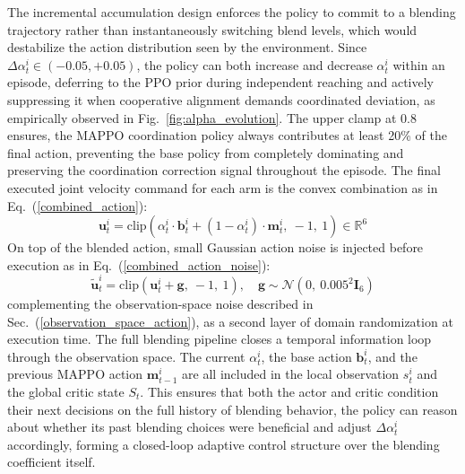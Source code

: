 \documentclass[lettersize,journal]{IEEEtran}
\begin{document}
The incremental accumulation design enforces the policy to commit to a blending trajectory rather than instantaneously switching blend levels, which would destabilize the action distribution seen by the environment. Since $\Delta \alpha_t^i \in (-0.05, +0.05)$, the policy can both increase and decrease $\alpha_t^i$ within an episode, deferring to the PPO prior during independent reaching and actively suppressing it when cooperative alignment demands coordinated deviation, as empirically observed in Fig.~\ref{fig:alpha_evolution}. The upper clamp at 0.8 ensures, the MAPPO coordination policy always contributes at least 20\% of the final action, preventing the base policy from completely dominating and preserving the coordination correction signal throughout the episode. The final executed joint velocity command for each arm is the convex combination as in Eq.~(\ref{combined_action}):
\begin{equation}
\mathbf{u}_t^i = \mathrm{clip}\left( \alpha_t^i \cdot \mathbf{b}_t^i + (1 - \alpha_t^i)\cdot \mathbf{m}_t^i,\ -1,\ 1 \right) \in \mathbb{R}^6
\label{combined_action}
\end{equation}
On top of the blended action, small Gaussian action noise is injected before execution as in Eq.~(\ref{combined_action_noise}):
\begin{equation}
\mathbf{\tilde{u}}_t^i = \mathrm{clip}\left( \mathbf{u}_t^i + \mathbf{g},\ -1,\ 1 \right),
\quad
\mathbf{g} \sim \mathcal{N}\left( 0,\ 0.005^2 \mathbf{I}_6 \right)
\label{combined_action_noise}
\end{equation}
complementing the observation-space noise described in Sec.~(\ref{observation_space_action}), as a second layer of domain randomization at execution time. The full blending pipeline closes a temporal information loop through the observation space. The current $\alpha_t^i$, the base action $\mathbf{b}_t^i$, and the previous MAPPO action $\mathbf{m}_{t-1}^i$ are all included in the local observation $s_t^i$ and the global critic state $S_t$. This ensures that both the actor and critic condition their next decisions on the full history of blending behavior, the policy can reason about whether its past blending choices were beneficial and adjust $\Delta\alpha_t^i$ accordingly, forming a closed-loop adaptive control structure over the blending coefficient itself.
\end{document}

